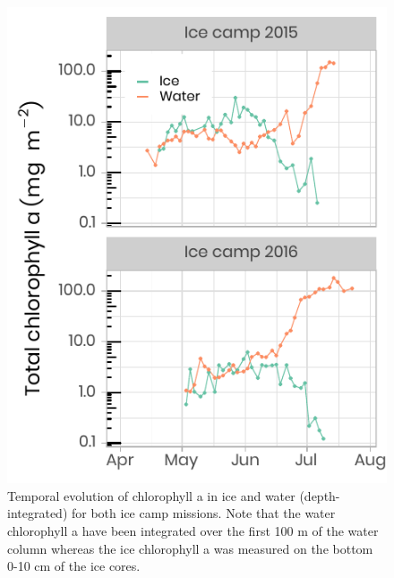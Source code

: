 \documentclass[12pt,a4paper]{scrartcl}
\begin{document}
\begin{figure}[h]
	\centering
	\includegraphics[scale = 2]{../../../graphs/fig9.pdf}
	\caption{Temporal evolution of chlorophyll a in ice and water (depth-integrated) for both ice camp missions. Note that the water chlorophyll a have been integrated over the first 100 m of the water column whereas the ice chlorophyll a was measured on the bottom 0-10 cm of the ice cores.}
\end{figure}

\clearpage
\newpage
\end{document}
